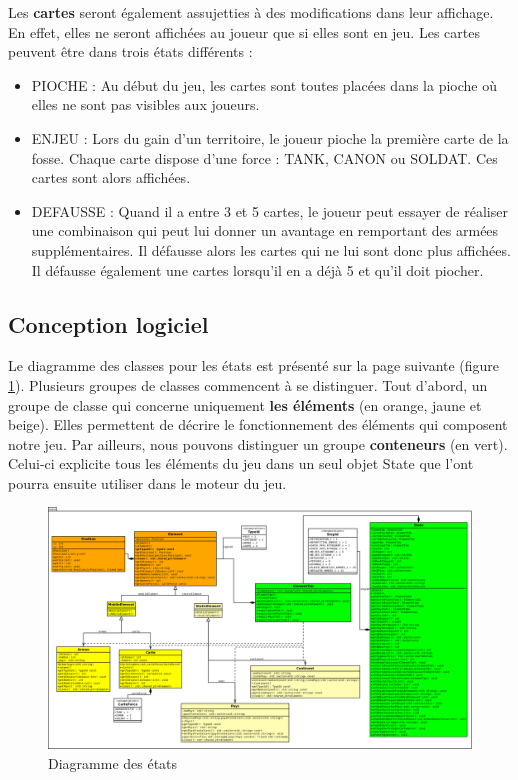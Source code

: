 \vspace{0.8cm}
Les \textbf{cartes} seront également assujetties à des modifications dans leur affichage. En effet, elles ne seront affichées au joueur que si elles sont en jeu. Les cartes peuvent être dans trois états différents :
\newline 

\begin{itemize}
    \item PIOCHE : Au début du jeu, les cartes sont toutes placées dans la pioche où elles ne sont pas visibles aux joueurs.
    \item ENJEU : Lors du gain d'un territoire, le joueur pioche la première carte de la fosse. Chaque carte dispose d'une force : TANK, CANON ou SOLDAT. Ces cartes sont alors affichées.
    \item DEFAUSSE :  Quand il a entre 3 et 5 cartes, le joueur peut essayer de réaliser une combinaison qui peut lui donner un avantage en remportant des armées supplémentaires. Il défausse alors les cartes qui ne lui sont donc plus affichées. 
    Il défausse également une cartes lorsqu'il en a déjà 5 et qu'il doit piocher.
\end{itemize}

\subsection{Conception logiciel}
Le diagramme des classes pour les états est présenté sur la page suivante (figure \ref{fig:state}). Plusieurs groupes de classes commencent à se distinguer. 
Tout d'abord, un groupe de classe qui concerne uniquement \textbf{les éléments} (en orange, jaune et beige). Elles permettent de décrire le fonctionnement des éléments qui composent notre jeu. 
\newline 
\newline 
Par ailleurs, nous pouvons distinguer un groupe \textbf{conteneurs} (en vert). Celui-ci explicite tous les éléments du jeu dans un seul objet State que l'ont pourra ensuite utiliser dans le moteur du jeu.

\newpage

\begin{landscape}
    \begin{figure}[!htbp]
        \centering
        \includegraphics[width=21cm]{Images/state.png}
        \caption{Diagramme des états}
        \label{fig:state}
    \end{figure}
\end{landscape}
